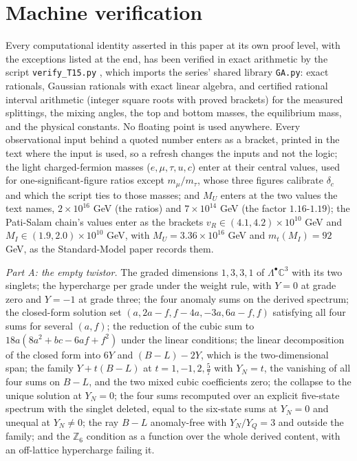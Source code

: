 \documentclass[11pt]{article}
\theoremstyle{definition}
\newcommand{\C}{\mathbb{C}}
\begin{document}
\section{Machine verification}\label{sec:verification}

Every computational identity asserted in this paper at its own proof level, with the exceptions listed at the end, has been verified in exact arithmetic by the script \texttt{verify\_T15.py} \cite{ButlerVerifyT15}, which imports the series' shared library \texttt{GA.py}: exact rationals, Gaussian rationals with exact linear algebra, and certified rational interval arithmetic (integer square roots with proved brackets) for the measured splittings, the mixing angles, the top and bottom masses, the equilibrium mass, and the physical constants. No floating point is used anywhere. Every observational input behind a quoted number enters as a bracket, printed in the text where the input is used, so a refresh changes the inputs and not the logic; the light charged-fermion masses ($e, \mu, \tau, u, c$) enter at their central values, used for one-significant-figure ratios except $m_{\mu}/m_{\tau}$, whose three figures calibrate $\delta_{c}$ and which the script ties to those masses; and $M_{U}$ enters at the two values the text names, $2 \times 10^{16}$ GeV (the ratios) and $7 \times 10^{14}$ GeV (the factor $1.16$-$1.19$); the Pati-Salam chain's values enter as the brackets $v_{R} \in (4.1, 4.2) \times 10^{10}$ GeV and $M_{I} \in (1.9, 2.0) \times 10^{10}$ GeV, with $M_{U} = 3.36 \times 10^{16}$ GeV and $m_{t}(M_{I}) = 92$ GeV, as the Standard-Model paper records them.

\emph{Part A: the empty twistor.} The graded dimensions $1, 3, 3, 1$ of $\Lambda^{\bullet}\C^{3}$ with its two singlets; the hypercharge per grade under the weight rule, with $Y = 0$ at grade zero and $Y = -1$ at grade three; the four anomaly sums on the derived spectrum; the closed-form solution set $(a, 2a - f, f - 4a, -3a, 6a - f, f)$ satisfying all four sums for several $(a, f)$; the reduction of the cubic sum to $18a(8a^{2} + bc - 6af + f^{2})$ under the linear conditions; the linear decomposition of the closed form into $6Y$ and $(B - L) - 2Y$, which is the two-dimensional span; the family $Y + t(B - L)$ at $t = 1, -1, 2, \tfrac57$ with $Y_{N} = t$, the vanishing of all four sums on $B - L$, and the two mixed cubic coefficients zero; the collapse to the unique solution at $Y_{N} = 0$; the four sums recomputed over an explicit five-state spectrum with the singlet deleted, equal to the six-state sums at $Y_{N} = 0$ and unequal at $Y_{N} \neq 0$; the ray $B - L$ anomaly-free with $Y_{N}/Y_{Q} = 3$ and outside the family; and the $\mathbb{Z}_{6}$ condition as a function over the whole derived content, with an off-lattice hypercharge failing it.
\end{document}
